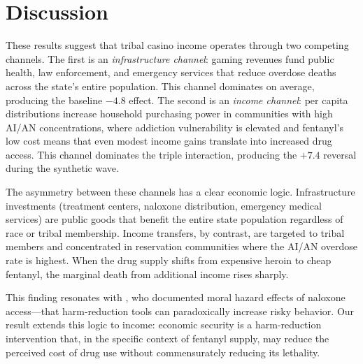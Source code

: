 \documentclass[12pt]{article}
\begin{document}


\section{Discussion}

These results suggest that tribal casino income operates through two competing channels. The first is an \textit{infrastructure channel}: gaming revenues fund public health, law enforcement, and emergency services that reduce overdose deaths across the state's entire population. This channel dominates on average, producing the baseline $-4.8$ effect. The second is an \textit{income channel}: per capita distributions increase household purchasing power in communities with high AI/AN concentrations, where addiction vulnerability is elevated and fentanyl's low cost means that even modest income gains translate into increased drug access. This channel dominates the triple interaction, producing the $+7.4$ reversal during the synthetic wave.

The asymmetry between these channels has a clear economic logic. Infrastructure investments (treatment centers, naloxone distribution, emergency medical services) are public goods that benefit the entire state population regardless of race or tribal membership. Income transfers, by contrast, are targeted to tribal members and concentrated in reservation communities where the AI/AN overdose rate is highest. When the drug supply shifts from expensive heroin to cheap fentanyl, the marginal death from additional income rises sharply.

This finding resonates with \citet{doleac2020moral}, who documented moral hazard effects of naloxone access---that harm-reduction tools can paradoxically increase risky behavior. Our result extends this logic to income: economic security is a harm-reduction intervention that, in the specific context of fentanyl supply, may reduce the perceived cost of drug use without commensurately reducing its lethality.
\end{document}

